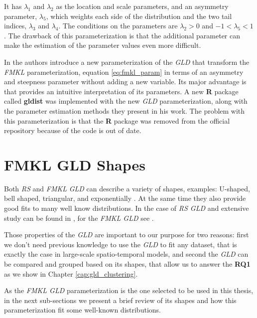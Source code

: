It has $\lambda_{1}$ and $\lambda_{2}$ as the location and scale parameters, and an asymmetry parameter, $\lambda_{5}$, which weights each side of the distribution and the two tail indices, $\lambda_{3}$ and $\lambda_{4}$. The conditions on the parameters are $\lambda_{2} > 0$ and $-1 < \lambda_{5} < 1$. The drawback of this parameterization is that the additional parameter can make the estimation of the parameter values even more difficult.

In \cite{Chalabi2012} the authors introduce a new parameterization of the \textit{GLD} that transform the \textit{FMKL} parameterization, equation \ref{eq:fmkl_param} in terms of an asymmetry and steepness parameter without adding a new variable. Its major advantage is that provides an intuitive interpretation of its parameters. A new \textbf{R} package called \textbf{gldist} was implemented with the new \textit{GLD} parameterization, along with the parameter estimation methods they present in his work. The problem with this parameterization is  that the \textbf{R} package was removed from the official repository because of the code is out of date.

\section{FMKL GLD Shapes}\label{sec:gld_shapes}
Both \textit{RS} and \textit{FMKL} \textit{GLD} can describe a variety of shapes, examples: U-shaped, bell shaped, triangular, and exponentially \cite{Su2007}. At the same time they also provide good fits to many well know distributions. In the case of \textit{RS GLD} and extensive study can be found in \cite{Karian2011}, for the \textit{FMKL GLD} see \cite{Freimer1988}. 

Those properties of the \textit{GLD} are important to our purpose for two reasons: first we don't need previous knowledge to use the \textit{GLD} to fit any dataset, that is exactly the case in large-scale spatio-temporal models, and second the \textit{GLD} can be compared and grouped based on its shapes, that allow us to answer the \textbf{RQ1} as we show in Chapter \ref{cap:gld_clustering}.

As the \textit{FMKL GLD} parameterization is the one selected to be used in this thesis, in the next sub-sections we present a brief review of its shapes and how this parameterization fit some well-known distributions.

